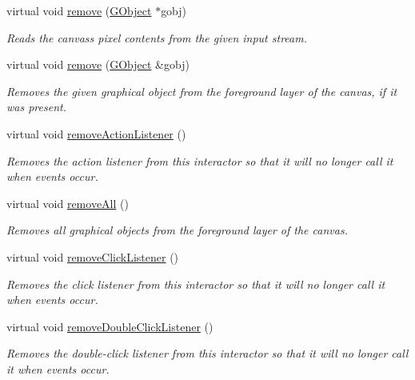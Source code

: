 \begin{DoxyCompactItemize}
virtual void \mbox{\hyperlink{classGCanvas_a49dc57a2ce4caa354a5fff6acdde2e7d}{remove}} (\mbox{\hyperlink{classGObject}{G\+Object}} $\ast$gobj)
\begin{DoxyCompactList}\small\item\em Reads the canvas\textquotesingle{}s pixel contents from the given input stream. \end{DoxyCompactList}\item 
virtual void \mbox{\hyperlink{classGCanvas_a0c0ae4d69b584602ff3cba0d9cf330a4}{remove}} (\mbox{\hyperlink{classGObject}{G\+Object}} \&gobj)
\begin{DoxyCompactList}\small\item\em Removes the given graphical object from the foreground layer of the canvas, if it was present. \end{DoxyCompactList}\item 
virtual void \mbox{\hyperlink{classGInteractor_ab7fe7a876367b87cf7202f947f1d05e4}{remove\+Action\+Listener}} ()
\begin{DoxyCompactList}\small\item\em Removes the action listener from this interactor so that it will no longer call it when events occur. \end{DoxyCompactList}\item 
virtual void \mbox{\hyperlink{classGCanvas_a9b0a5a3ad9972ab0e8eb0b54873aac6b}{remove\+All}} ()
\begin{DoxyCompactList}\small\item\em Removes all graphical objects from the foreground layer of the canvas. \end{DoxyCompactList}\item 
virtual void \mbox{\hyperlink{classGInteractor_ad39d0325cde6b97ebda4b9d7787c633b}{remove\+Click\+Listener}} ()
\begin{DoxyCompactList}\small\item\em Removes the click listener from this interactor so that it will no longer call it when events occur. \end{DoxyCompactList}\item 
virtual void \mbox{\hyperlink{classGInteractor_aa4250907e4cdd77349c04f0cf5cdd3d3}{remove\+Double\+Click\+Listener}} ()
\begin{DoxyCompactList}\small\item\em Removes the double-\/click listener from this interactor so that it will no longer call it when events occur. \end{DoxyCompactList}\item 

\end{DoxyCompactItemize}

